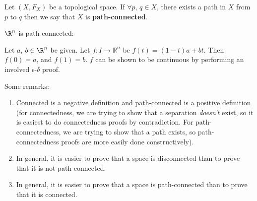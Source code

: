 \begin{definition}
Let $(X, F_X)$ be a topological space. If $\forall p$, $q \in X$, there exists a path in $X$ from $p$ to $q$ then we say that $X$ is \textbf{path-connected}.
\end{definition}

\begin{example}
$\R^n$ is path-connected:

Let $a$, $b \in \R^n$ be given. Let $f: I \rightarrow \mathbb{R}^n$ be $f(t) = (1-t)a + bt$. Then $f(0) = a$, and $f(1) = b$. $f$ can be shown to be continuous by performing an involved $\epsilon$-$\delta$ proof.
\end{example}

Some remarks:
\begin{enumerate}
\item Connected is a negative definition and path-connected is a positive definition (for connectedness, we are trying to show that a separation \emph{doesn't} exist, so it is easiest to do connectedness proofs by contradiction. For path-connectedness, we are trying to show that a path exists, so path-connectedness proofs are more easily done constructively).
\item In general, it is easier to prove that a space is disconnected than to prove that it is not path-connected.
\item In general, it is easier to prove that a space is path-connected than to prove that it is connected.
\end{enumerate}


